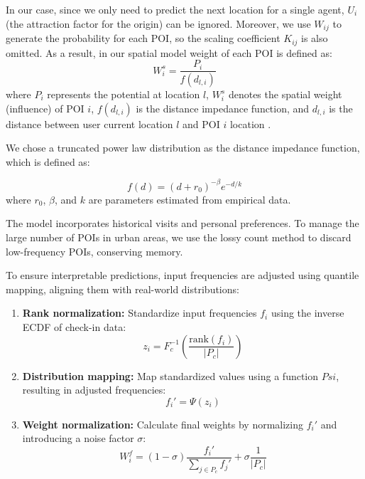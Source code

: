 In our case, since we only need to predict the next location for a single agent, $U_i$ (the attraction factor for the origin) can be ignored. Moreover, we use $W_{ij}$ to generate the probability for each POI, so the scaling coefficient $K_{ij}$ is also omitted. As a result, in our spatial model weight of each POI is defined as:
\begin{equation}
    W^s_i =  \frac{P_i}{f(d_{l,i})}
\end{equation}
where $P_i$ represents the potential at location $l$, $W^s_i$ denotes the spatial weight (influence) of POI $i$, $f(d_{l,i})$ is the distance impedance function, and $ d_{l,i}$ is the distance between user current location $l$ and POI $i$ location .

We chose a truncated power law distribution \cite{gonzalez2008mobility} as the distance impedance function, which is defined as:

\begin{equation}
    f(d) = (d + r_0)^{-\beta}e^{-d/k}
\end{equation}
where $r_0$, $\beta$, and $k$ are parameters estimated from empirical data.

The model incorporates historical visits and personal preferences. To manage the large number of POIs in urban areas, we use the lossy count method to discard low-frequency POIs, conserving memory.  

To ensure interpretable predictions, input frequencies are adjusted using quantile mapping, aligning them with real-world distributions:
\begin{enumerate}
    \item \textbf{Rank normalization:} Standardize input frequencies $f_i$ using the inverse ECDF of check-in data:
    \begin{equation}
    z_i = F_c^{-1}\left(\frac{\text{rank}(f_i)}{|P_c|}\right)
    \end{equation}
    \item \textbf{Distribution mapping:} Map standardized values using a function $Psi$, resulting in adjusted frequencies:
    \begin{equation}
    f_i' = \Psi(z_i)
    \end{equation}
    \item \textbf{Weight normalization:} Calculate final weights by normalizing \(f_i'\) and introducing a noise factor $\sigma$:
    \begin{equation}
    W^f_i = (1-\sigma) \frac{f_i'}{\sum_{j \in P_c} f_j'} + \sigma \frac{1}{|P_c|}
    \end{equation}
\end{enumerate}


